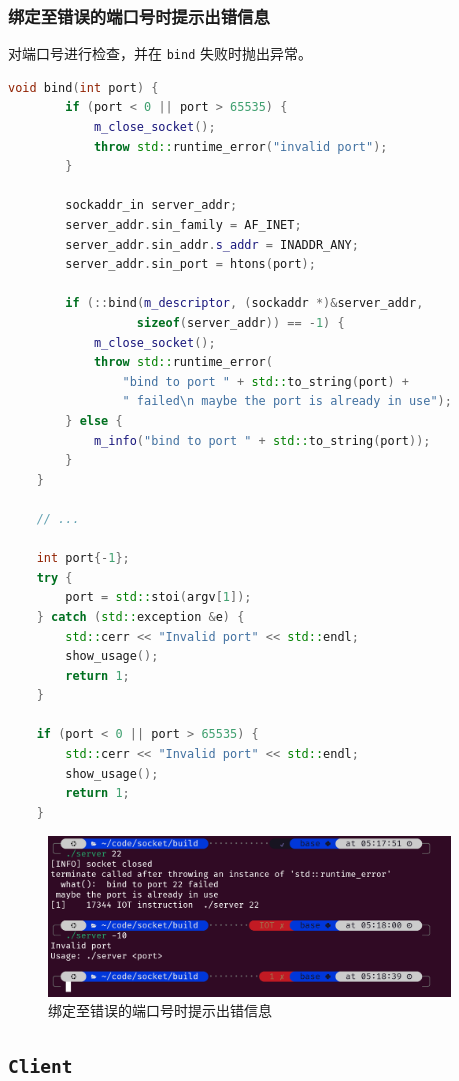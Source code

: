 \documentclass{article}
\begin{document}
\subsubsection{绑定至错误的端口号时提示出错信息}

对端口号进行检查，并在 \texttt{bind} 失败时抛出异常。

\begin{lstlisting}[language=C++]
    void bind(int port) {
        if (port < 0 || port > 65535) {
            m_close_socket();
            throw std::runtime_error("invalid port");
        }

        sockaddr_in server_addr;
        server_addr.sin_family = AF_INET;
        server_addr.sin_addr.s_addr = INADDR_ANY;
        server_addr.sin_port = htons(port);

        if (::bind(m_descriptor, (sockaddr *)&server_addr,
                  sizeof(server_addr)) == -1) {
            m_close_socket();
            throw std::runtime_error(
                "bind to port " + std::to_string(port) +
                " failed\n maybe the port is already in use");
        } else {
            m_info("bind to port " + std::to_string(port));
        }
    }

    // ...

    int port{-1};
    try {
        port = std::stoi(argv[1]);
    } catch (std::exception &e) {
        std::cerr << "Invalid port" << std::endl;
        show_usage();
        return 1;
    }

    if (port < 0 || port > 65535) {
        std::cerr << "Invalid port" << std::endl;
        show_usage();
        return 1;
    }
\end{lstlisting}

\begin{figure}[H]
    \centering
    \includegraphics[width=0.95\textwidth]{img/3.png}
    \caption{绑定至错误的端口号时提示出错信息}
\end{figure}

\subsection{\texttt{Client}}
\end{document}

